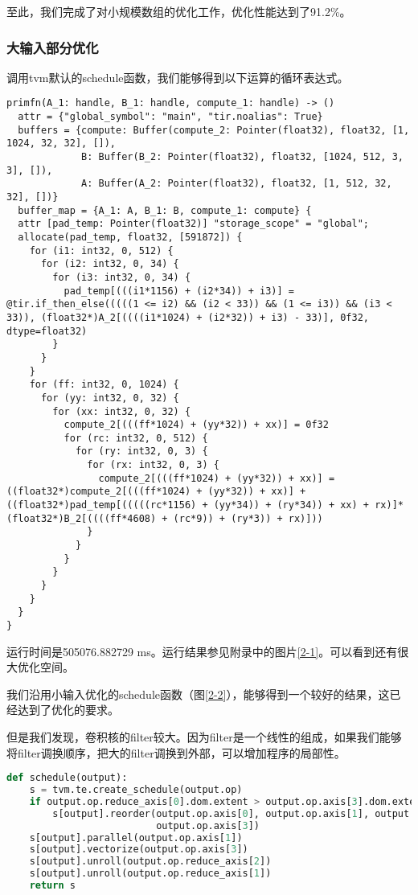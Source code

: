 至此，我们完成了对小规模数组的优化工作，优化性能达到了91.2\%。

\subsubsection{大输入部分优化}

调用tvm默认的schedule函数，我们能够得到以下运算的循环表达式。

\begin{lstlisting}[caption=大输入原始循环表达式，在test2.old.ir文件中]
primfn(A_1: handle, B_1: handle, compute_1: handle) -> ()
  attr = {"global_symbol": "main", "tir.noalias": True}
  buffers = {compute: Buffer(compute_2: Pointer(float32), float32, [1, 1024, 32, 32], []),
             B: Buffer(B_2: Pointer(float32), float32, [1024, 512, 3, 3], []),
             A: Buffer(A_2: Pointer(float32), float32, [1, 512, 32, 32], [])}
  buffer_map = {A_1: A, B_1: B, compute_1: compute} {
  attr [pad_temp: Pointer(float32)] "storage_scope" = "global";
  allocate(pad_temp, float32, [591872]) {
    for (i1: int32, 0, 512) {
      for (i2: int32, 0, 34) {
        for (i3: int32, 0, 34) {
          pad_temp[(((i1*1156) + (i2*34)) + i3)] = @tir.if_then_else(((((1 <= i2) && (i2 < 33)) && (1 <= i3)) && (i3 < 33)), (float32*)A_2[((((i1*1024) + (i2*32)) + i3) - 33)], 0f32, dtype=float32)
        }
      }
    }
    for (ff: int32, 0, 1024) {
      for (yy: int32, 0, 32) {
        for (xx: int32, 0, 32) {
          compute_2[(((ff*1024) + (yy*32)) + xx)] = 0f32
          for (rc: int32, 0, 512) {
            for (ry: int32, 0, 3) {
              for (rx: int32, 0, 3) {
                compute_2[(((ff*1024) + (yy*32)) + xx)] = ((float32*)compute_2[(((ff*1024) + (yy*32)) + xx)] + ((float32*)pad_temp[(((((rc*1156) + (yy*34)) + (ry*34)) + xx) + rx)]*(float32*)B_2[((((ff*4608) + (rc*9)) + (ry*3)) + rx)]))
              }
            }
          }
        }
      }
    }
  }
}
\end{lstlisting}

运行时间是505076.882729 ms。运行结果参见附录中的图片\textcolor{MidnightBlue}{\ref{2-1}}。可以看到还有很大优化空间。

我们沿用小输入优化的schedule函数（图\textcolor{MidnightBlue}{\ref{2-2}}），能够得到一个较好的结果，这已经达到了优化的要求。

但是我们发现，卷积核的filter较大。因为filter是一个线性的组成，如果我们能够将filter调换顺序，把大的filter调换到外部，可以增加程序的局部性。

\begin{lstlisting}[caption=最终优化函数,language=python]
def schedule(output):
    s = tvm.te.create_schedule(output.op)
    if output.op.reduce_axis[0].dom.extent > output.op.axis[3].dom.extent:
        s[output].reorder(output.op.axis[0], output.op.axis[1], output.op.reduce_axis[0], output.op.axis[2],
                          output.op.axis[3])
    s[output].parallel(output.op.axis[1])
    s[output].vectorize(output.op.axis[3])
    s[output].unroll(output.op.reduce_axis[2])
    s[output].unroll(output.op.reduce_axis[1])
    return s
\end{lstlisting}


